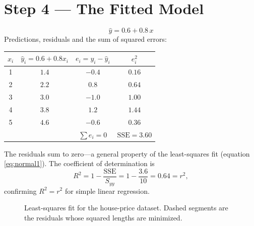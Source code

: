 \documentclass[11pt,a4paper]{report}
\theoremstyle{definition}
\theoremstyle{plain}
\theoremstyle{remark}
\begin{document}
	\section{Step 4 --- The Fitted Model}
	\begin{equation}
		\boxed{\;\hat y = 0.6 + 0.8\,x\;}
	\end{equation}
	Predictions, residuals and the sum of squared errors:
	\begin{center}
		\begin{tabular}{@{}cccc@{}}
			\toprule
			$x_i$ & $\hat y_i=0.6+0.8x_i$ & $e_i=y_i-\hat y_i$ & $e_i^2$\\
			\midrule
			1 & $1.4$ & $-0.4$ & $0.16$\\
			2 & $2.2$ & $ 0.8$ & $0.64$\\
			3 & $3.0$ & $-1.0$ & $1.00$\\
			4 & $3.8$ & $ 1.2$ & $1.44$\\
			5 & $4.6$ & $-0.6$ & $0.36$\\
			\midrule
			&       & $\sum e_i=0$ & $\text{SSE}=3.60$\\
			\bottomrule
		\end{tabular}
	\end{center}
	The residuals sum to zero---a general property of the least-squares fit
	(equation \eqref{eq:normal1}). The coefficient of determination is
	\[
	R^2=1-\frac{\text{SSE}}{S_{yy}}=1-\frac{3.6}{10}=0.64=r^2 ,
	\]
	confirming $R^2=r^2$ for simple linear regression.
	
	\begin{figure}[ht]
		\centering
		\caption{Least-squares fit for the house-price dataset. Dashed segments are the
			residuals whose squared lengths are minimized.}
		\label{fig:fit}
	\end{figure}
	
\end{document}
